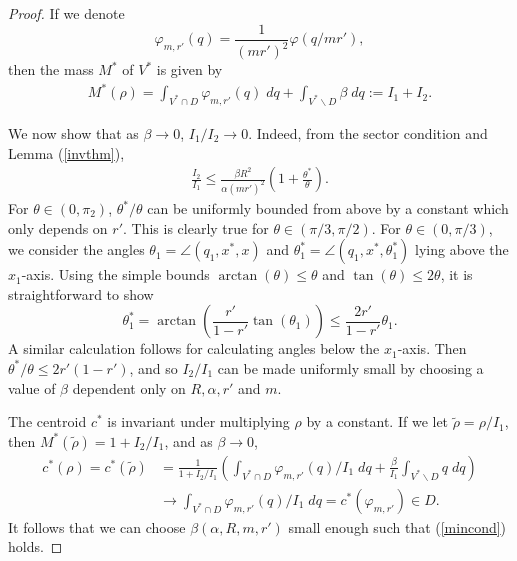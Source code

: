 \documentclass[onefignum,onetabnum]{siamart171218} %
\begin{document}
\begin{proof}

If we denote
\begin{equation}
    \varphi_{m,r'}(q) = \frac{1}{(mr')^2}\varphi(q/mr'),
\end{equation} 
then the mass $M^*$ of $V^*$ is given by 
\begin{align}
    M^*(\rho) = \int_{V^* \cap D} \varphi_{m,r'}(q)\;dq + \int_{V^*\backslash D} \beta \; dq:= I_1 + I_2.
\end{align}


We now show that as $\beta\rightarrow 0$, $I_1/I_2\rightarrow 0$.  Indeed, from the sector condition and Lemma (\ref{invthm}),
\begin{align}
    \frac{I_2}{I_1}  \le \frac{\beta R^2}{\alpha(mr')^2}\left(1+ \frac{\theta^*}{\theta} \right).
\end{align}
For  $\theta \in (0, \pi_2)$,  $\theta^*/\theta$ can be uniformly bounded from above by a constant which only depends on $r'$.  This is clearly true for $\theta \in (\pi/3, \pi/2)$.  For $\theta \in (0, \pi/3)$, we consider the angles $\theta_1 = \angle(q_1, x^*, x)$ and $\theta_1^* = \angle(q_1, x^*, \theta_1^*)$ lying above the $x_1$-axis. Using the simple bounds $\arctan(\theta) \le \theta$ and $\tan(\theta) \le 2 \theta$, it is straightforward to show
\begin{equation}
    \theta_1^* = \arctan\left(\frac{r'}{1-r'}\tan(\theta_1)  \right)\le \frac{2r'}{1-r'} \theta_1. 
\end{equation}
A similar calculation follows for calculating angles below the $x_1$-axis. Then $\theta^*/\theta \le 2r'(1-r')$, and so $I_2/I_1$ can be made uniformly small by choosing a value of $\beta$ dependent only on $R,\alpha, r'$ and $m$.  

The centroid $c^*$ is invariant under multiplying $\rho$ by a constant.  If we let $\tilde \rho = \rho/I_1$, then $M^*(\tilde \rho) = 1+ I_2/I_1$, and as $\beta\rightarrow 0$,
\begin{align}
    c^*(\rho) = c^*(\tilde \rho) &= \frac{1}{1+ I_2/I_1}\left(\int_{V^* \cap D} \varphi_{m,r'}(q)/I_1\;dq + \frac{\beta}{I_1}\int_{V^*\backslash D} q\;dq\right)
    \\
    &\rightarrow \int_{V^* \cap D} \varphi_{m,r'}(q)/I_1\;dq = c^*(\varphi_{m,r'}) \in D.
\end{align}
It follows that we can choose $\beta(\alpha,R, m, r') $ small enough such that (\ref{mincond}) holds.
\end{proof}







% 
\end{document}
